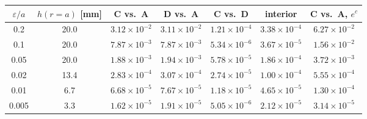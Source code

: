 \begin{tabular}{ccccccc}
\toprule
$\varepsilon/a$ & $h(r{=}a)$ [mm] & C vs.\ A & D vs.\ A & C vs.\ D & interior & C vs.\ A, $e^{c}$ \\
\midrule
0.2 & 20.0 & $3.12\times 10^{-2}$ & $3.11\times 10^{-2}$ & $1.21\times 10^{-4}$ & $3.38\times 10^{-4}$ & $6.27\times 10^{-2}$ \\
0.1 & 20.0 & $7.87\times 10^{-3}$ & $7.87\times 10^{-3}$ & $5.34\times 10^{-6}$ & $3.67\times 10^{-5}$ & $1.56\times 10^{-2}$ \\
0.05 & 20.0 & $1.88\times 10^{-3}$ & $1.94\times 10^{-3}$ & $5.78\times 10^{-5}$ & $1.86\times 10^{-4}$ & $3.72\times 10^{-3}$ \\
0.02 & 13.4 & $2.83\times 10^{-4}$ & $3.07\times 10^{-4}$ & $2.74\times 10^{-5}$ & $1.00\times 10^{-4}$ & $5.55\times 10^{-4}$ \\
0.01 & 6.7 & $6.68\times 10^{-5}$ & $7.67\times 10^{-5}$ & $1.18\times 10^{-5}$ & $4.65\times 10^{-5}$ & $1.30\times 10^{-4}$ \\
0.005 & 3.3 & $1.62\times 10^{-5}$ & $1.91\times 10^{-5}$ & $5.05\times 10^{-6}$ & $2.12\times 10^{-5}$ & $3.14\times 10^{-5}$ \\
\bottomrule
\end{tabular}
